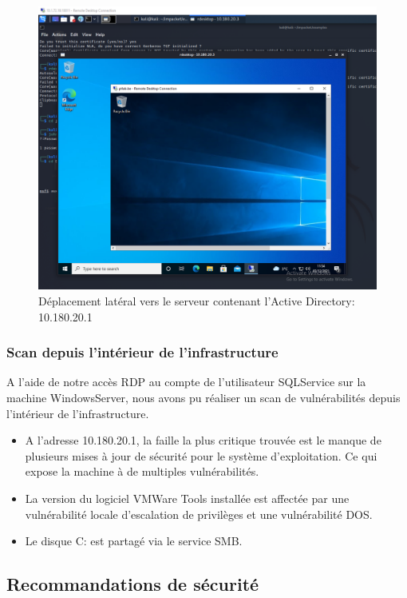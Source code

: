 \documentclass[french,paper=a4,oneside,captions=tableheading]{article}
\begin{document}
\begin{figure}[H]
    \centering
    \includegraphics[width=0.90\linewidth]{images/lateral2.png}
    \caption{Déplacement latéral vers le serveur contenant l'Active Directory: 10.180.20.1}
    \label{fig:lateral2}
\end{figure}



\subsubsection{Scan depuis l'intérieur de l'infrastructure}

A l'aide de notre accès RDP au compte de l'utilisateur SQLService sur la machine WindowsServer, nous avons pu réaliser un scan de vulnérabilités depuis l'intérieur de l'infrastructure.\\
\begin{itemize}
    \item A l'adresse 10.180.20.1, la faille la plus critique trouvée est le manque de plusieurs mises à jour de sécurité pour le système d'exploitation. Ce qui expose la machine à de multiples vulnérabilités.
    \item La version du logiciel VMWare Tools installée est affectée par une vulnérabilité locale d'escalation de privilèges et une vulnérabilité DOS.
    \item Le disque C: est partagé via le service SMB.
\end{itemize}



\subsection{Recommandations de sécurité} \label{mesures}
\end{document}
